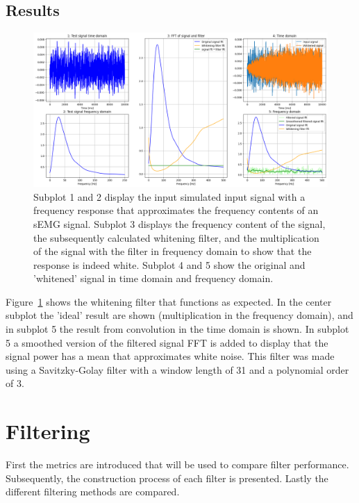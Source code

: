 \subsection{Results}
\begin{figure}[h!t]
	\begin{center}
		\includegraphics[width=1.0\columnwidth]{images/prewhitening_simulation.png}
	\end{center}
	\caption{Subplot 1 and 2 display the input simulated input signal with a frequency response that approximates the frequency contents of an sEMG signal. Subplot 3 displays the frequency content of the signal, the subsequently calculated whitening filter, and the multiplication of the signal with the filter in frequency domain to show that the response is indeed white. Subplot 4 and 5 show the original and 'whitened' signal in time domain and frequency domain.}
	\label{fig:whitening_simulation}
\end{figure}

Figure~\ref{fig:whitening_simulation} shows the whitening filter that functions as expected. In the center subplot the 'ideal' result are shown (multiplication in the frequency domain), and in subplot 5 the result from convolution in the time domain is shown. In subplot 5 a smoothed version of the filtered signal FFT is added to display that the signal power has a mean that approximates white noise. This filter was made using a Savitzky-Golay filter with a window length of 31 and a polynomial order of 3.

\section{Filtering}
First the metrics are introduced that will be used to compare filter performance. Subsequently, the construction process of each filter is presented. Lastly the different filtering methods are compared.

